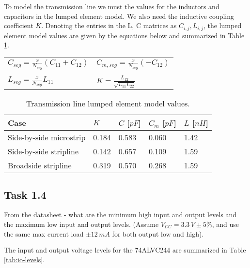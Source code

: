 \documentclass[../main.tex]{subfiles}
\begin{document}
\solution

To model the transmission line we must the values for the inductors and capacitors in the lumped element model. We also need the inductive coupling coefficient $K$. Denoting the entries in the L, C matrices as $C_{i,j}, L_{i,j}$, the lumped element model values are given by the equations below and summarized in Table \ref{tab:tl-params}.

\begin{table}[h]
    \centering
    \begin{tabular}{l l}
        $C_{seg} = \frac{x}{N_{seg}} \left( C_{11} + C_{12} \right)$ & $C_{m, seg} = \frac{x}{N_{seg}} (-C_{12})$ \\
        & \\
        $L_{seg} = \frac{x}{N_{seg}} L_{11}$ & $K = \frac{L_{12}}{\sqrt{L_{11}L_{22}}}$ \\
    \end{tabular}
\end{table}

\begin{table}[h]
    \centering
    \begin{tabular}{l|l l l l}
        \toprule[1pt]
        \textbf{Case} & $K$ & $C$ [$\si{pF}$] & $C_m$ [$\si{pF}$] & $L$ [$\si{nH}$] \\
        \midrule
        Side-by-side microstrip & 0.184 & 0.583 & 0.060 & 1.42 \\
        Side-by-side stripline  & 0.142 & 0.657 & 0.109 & 1.59 \\
        Broadside stripline     & 0.319 & 0.570 & 0.268 & 1.59 \\
        \bottomrule[1pt]
    \end{tabular}
    \caption{Transmission line lumped element model values.}
    \label{tab:tl-params}
\end{table}

\subsection{Task 1.4}

From the datasheet - what are the minimum high input and output levels and the maximum low input and output levels. (Assume $V_{CC} = 3.3\,\si{V} \pm 5\%$, and use the same max current load $\pm 12 \,\si{mA}$ for both output low and high).

\solution

The input and output voltage levels for the 74ALVC244 are summarized in Table \ref{tab:io-levels}.
\end{document}
